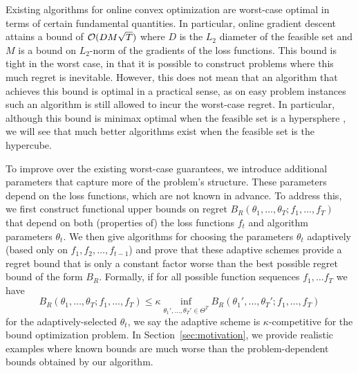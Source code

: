 Existing algorithms for online convex optimization are worst-case
optimal in terms of certain fundamental quantities.  In particular,
online gradient descent attains a bound of $\mathcal{O}(DM\sqrt{T})$ where $D$
is the $L_2$ diameter of the feasible set and $M$ is a bound on
$L_2$-norm of the gradients of the loss functions.  This bound is
tight in the worst case, in that it is possible to construct problems
where this much regret is inevitable.  However, this does not mean
that an algorithm that achieves this bound is optimal in a practical
sense, as on easy problem instances such an algorithm is still allowed
to incur the worst-case regret.  In particular, although this bound is
minimax optimal when the feasible set is a hypersphere \cite
{abernethy08}, we will see that much better algorithms exist when the
feasible set is the hypercube.

To improve over the existing worst-case guarantees,
we introduce additional parameters that capture more of the
problem's structure.
These parameters depend on the loss functions, which are not
known in advance.
To address this, we
first construct functional upper bounds on regret $B_R(\theta_1,
\dots, \theta_T; f_1, \dots, f_T)$ that depend on both
(properties of) the loss functions $f_t$ and algorithm parameters $\theta_t$.
We then give algorithms for choosing the
parameters $\theta_t$ adaptively (based only on $f_1, f_2, \ldots, f_{t-1}$)
and prove that these adaptive schemes provide a
regret bound that is only a constant factor worse than the best
possible regret bound of the form $B_R$.  Formally, if for all
possible function sequences $f_1, \dots f_T$ we have
\[
B_R(\theta_1, \dots, \theta_T; f_1, \dots, f_T) \leq \kappa 
\inf_{\theta_1', \dots, \theta_T' \in \Theta^T} 
B_R(\theta_1', \dots, \theta_T'; f_1, \dots, f_T)
\]
for the adaptively-selected $\theta_t$, we say the adaptive scheme is
$\kappa$-competitive for the bound optimization problem.
In
Section~\ref{sec:motivation}, we provide realistic examples where known bounds
are much worse than the problem-dependent bounds obtained by our
algorithm.

